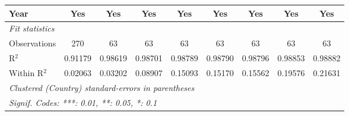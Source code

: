 \begin{table}[htbp]
\begin{tabular}{lcccccccc}
      Year                                                      & Yes            & Yes      & Yes      & Yes           & Yes           & Yes           & Yes           & Yes\\  
      \midrule
      \emph{Fit statistics}\\
      Observations                                              & 270            & 63       & 63       & 63            & 63            & 63            & 63            & 63\\  
      R$^2$                                                     & 0.91179        & 0.98619  & 0.98701  & 0.98789       & 0.98790       & 0.98796       & 0.98853       & 0.98882\\  
      Within R$^2$                                              & 0.02063        & 0.03202  & 0.08907  & 0.15093       & 0.15170       & 0.15562       & 0.19576       & 0.21631\\  
      \midrule \midrule
      \multicolumn{9}{l}{\emph{Clustered (Country) standard-errors in parentheses}}\\
      \multicolumn{9}{l}{\emph{Signif. Codes: ***: 0.01, **: 0.05, *: 0.1}}\\
   \end{tabular}
\end{table}


